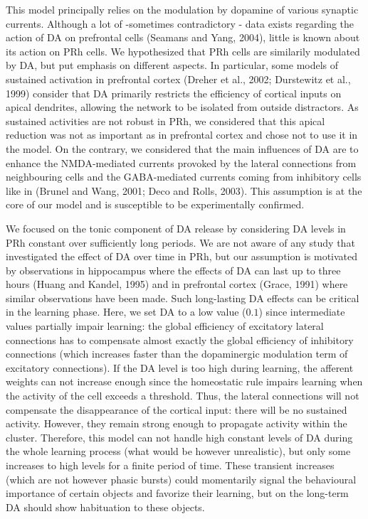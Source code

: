 \documentclass[
  11pt,
  a4paper,
]{scrbook}
\begin{document}
This model principally relies on the modulation by dopamine of various
synaptic currents. Although a lot of -sometimes contradictory - data
exists regarding the action of DA on prefrontal cells (Seamans and Yang,
2004), little is known about its action on PRh cells. We hypothesized
that PRh cells are similarily modulated by DA, but put emphasis on
different aspects. In particular, some models of sustained activation in
prefrontal cortex (Dreher et al., 2002; Durstewitz et al., 1999)
consider that DA primarily restricts the efficiency of cortical inputs
on apical dendrites, allowing the network to be isolated from outside
distractors. As sustained activities are not robust in PRh, we
considered that this apical reduction was not as important as in
prefrontal cortex and chose not to use it in the model. On the contrary,
we considered that the main influences of DA are to enhance the
NMDA-mediated currents provoked by the lateral connections from
neighbouring cells and the GABA-mediated currents coming from inhibitory
cells like in (Brunel and Wang, 2001; Deco and Rolls, 2003). This
assumption is at the core of our model and is susceptible to be
experimentally confirmed.

We focused on the tonic component of DA release by considering DA levels
in PRh constant over sufficiently long periods. We are not aware of any
study that investigated the effect of DA over time in PRh, but our
assumption is motivated by observations in hippocampus where the effects
of DA can last up to three hours (Huang and Kandel, 1995) and in
prefrontal cortex (Grace, 1991) where similar observations have been
made. Such long-lasting DA effects can be critical in the learning
phase. Here, we set DA to a low value (\(0.1\)) since intermediate
values partially impair learning: the global efficiency of excitatory
lateral connections has to compensate almost exactly the global
efficiency of inhibitory connections (which increases faster than the
dopaminergic modulation term of excitatory connections). If the DA level
is too high during learning, the afferent weights can not increase
enough since the homeostatic rule impairs learning when the activity of
the cell exceeds a threshold. Thus, the lateral connections will not
compensate the disappearance of the cortical input: there will be no
sustained activity. However, they remain strong enough to propagate
activity within the cluster. Therefore, this model can not handle high
constant levels of DA during the whole learning process (what would be
however unrealistic), but only some increases to high levels for a
finite period of time. These transient increases (which are not however
phasic bursts) could momentarily signal the behavioural importance of
certain objects and favorize their learning, but on the long-term DA
should show habituation to these objects.
\end{document}
